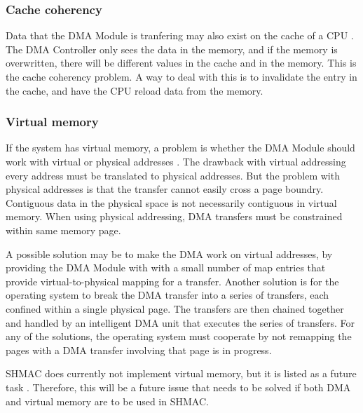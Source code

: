 \subsubsection{Cache coherency}
Data that the DMA Module is tranfering may also exist on the cache of a CPU \cite[p~594-595]{computer-construction}.
The DMA Controller only sees the data in the memory, and if the memory is overwritten, there will be different values in the cache and in the memory.
This is the cache coherency problem.
A way to deal with this is to invalidate the entry in the cache, and have the CPU reload data from the memory.

\subsubsection{Virtual memory}
If the system has virtual memory, a problem is whether the DMA Module should work with virtual or physical addresses \cite[p~595]{computer-construction}.
The drawback with virtual addressing every address must be translated to physical addresses.
But the problem with physical addresses is that the transfer cannot easily cross a page boundry.
Contiguous data in the physical space is not necessarily contiguous in virtual memory.
When using physical addressing, DMA transfers must be constrained within same memory page.

A possible solution may be to make the DMA work on virtual addresses, by providing the DMA Module with with a small number of map entries that provide virtual-to-physical mapping for a transfer.
Another solution is for the operating system to break the DMA transfer into a series of transfers, each confined within a single physical page.
The transfers are then chained together and handled by an intelligent DMA unit that executes the series of transfers. 
For any of the solutions, the operating system must cooperate by not remapping the pages with a DMA transfer involving that page is in progress.

SHMAC does currently not implement virtual memory, but it is listed as a future task \cite[p~10]{shmac-plan}.
Therefore, this will be a future issue that needs to be solved if both DMA and virtual memory are to be used in SHMAC. 

